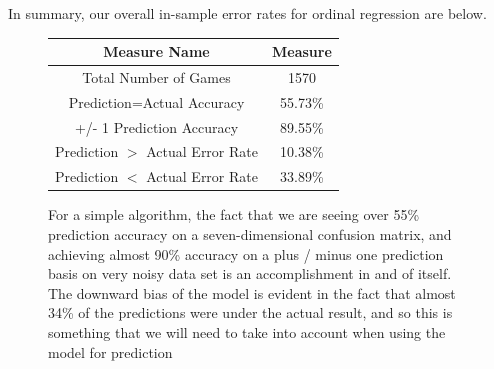 \documentclass[10pt,a4paper, hidelinks]{article} %
\begin{document}
In summary, our overall in-sample error rates for ordinal regression are below.
\begin{figure}[H]
	\centering 
	\begin{tabular}{cc}
		\toprule
		Measure Name & Measure\\ 
		\midrule
		Total Number of Games & 1570\\ 
		Prediction=Actual Accuracy & 55.73\%\\ 
		+/- 1 Prediction Accuracy & 89.55\%\\ 
		Prediction $>$ Actual Error Rate & 10.38\%\\ 
		Prediction $<$ Actual Error Rate & 33.89\%\\ 
		\bottomrule
	\end{tabular}
	\caption{For a simple algorithm, the fact that we are seeing over 55\% prediction accuracy on a seven-dimensional confusion matrix, and achieving almost 90\% accuracy on a plus / minus one prediction basis on very noisy data set is an accomplishment in and of itself. The downward bias of the model is evident in the fact that almost 34\% of the predictions were under the actual result, and so this is something that we will need to take into account when using the model for prediction}
\end{figure}













\end{document}
